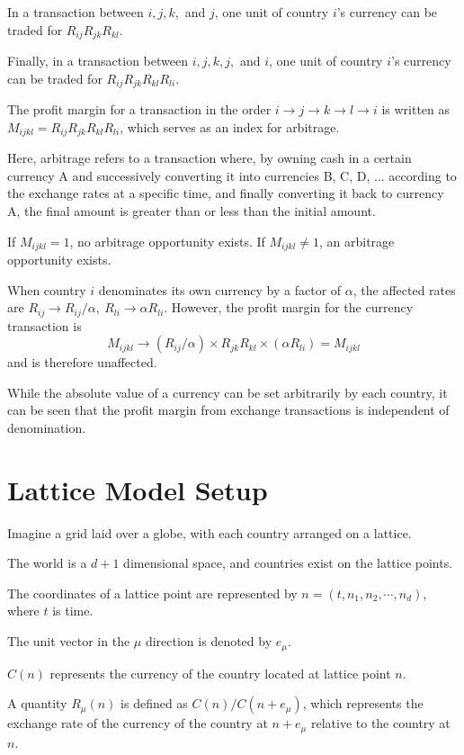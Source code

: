 \documentclass[uplatex]{jsarticle}
\begin{document}
In a transaction between $i,j,k,$ and $j$, one unit of country $i$'s currency can be traded for
$R_{ij} R_{jk} R_{kl}$.

Finally, in a transaction between $i,j,k,j,$ and $i$, one unit of country $i$'s currency can be traded for
$R_{ij} R_{jk} R_{kl} R_{li}$.

The profit margin for a transaction in the order $i \to j \to k \to l \to i$ is written as
$M_{ijkl} = R_{ij} R_{jk} R_{kl} R_{li}$, which serves as an index for arbitrage.

Here, arbitrage refers to a transaction where, by owning cash in a certain currency A and successively converting it into currencies B, C, D, ... according to the exchange rates at a specific time, and finally converting it back to currency A, the final amount is greater than or less than the initial amount.

If $M_{ijkl}=1$, no arbitrage opportunity exists.
If $M_{ijkl} \neq 1$, an arbitrage opportunity exists.

When country $i$ denominates its own currency by a factor of $\alpha$, the affected rates are
$R_{ij} \to R_{ij} / \alpha , \ R_{li} \to \alpha R_{li}$.
However, the profit margin for the currency transaction is
$$
	M_{ijkl} \to (R_{ij} / \alpha) \times R_{jk} R_{kl} \times (\alpha R_{li}) = M_{ijkl}
$$
and is therefore unaffected.

While the absolute value of a currency can be set arbitrarily by each country, it can be seen that the profit margin from exchange transactions is independent of denomination.



\section{\textbf{Lattice Model Setup}}

Imagine a grid laid over a globe, with each country arranged on a lattice.

The world is a $d+1$ dimensional space, and countries exist on the lattice points.

The coordinates of a lattice point are represented by $n = (t, n_{1},n_{2}, \cdots, n_{d})$, where $t$ is time.

The unit vector in the $\mu$ direction is denoted by $e_{\mu}$.

$C(n)$ represents the currency of the country located at lattice point $n$.

A quantity $R_{\mu}(n)$ is defined as $C(n) / C(n + e_{\mu})$, which represents the exchange rate of the currency of the country at $n + e_{\mu}$ relative to the country at $n$.
\end{document}
